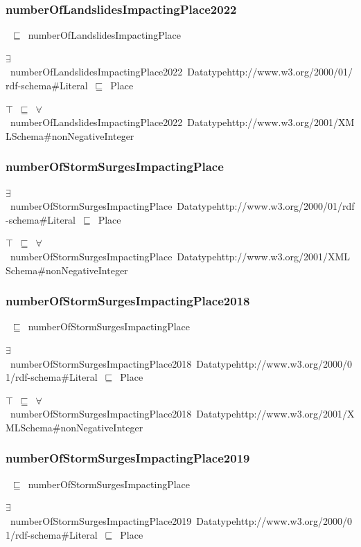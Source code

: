 \documentclass{article}
\begin{document}
\subsubsection*{numberOfLandslidesImpactingPlace2022}

~\ensuremath{\sqsubseteq}~numberOfLandslidesImpactingPlace

\ensuremath{\exists}~numberOfLandslidesImpactingPlace2022~Datatypehttp://www.w3.org/2000/01/rdf-schema#Literal~\ensuremath{\sqsubseteq}~Place

\ensuremath{\top}~\ensuremath{\sqsubseteq}~\ensuremath{\forall}~numberOfLandslidesImpactingPlace2022~Datatypehttp://www.w3.org/2001/XMLSchema#nonNegativeInteger

\subsubsection*{numberOfStormSurgesImpactingPlace}

\ensuremath{\exists}~numberOfStormSurgesImpactingPlace~Datatypehttp://www.w3.org/2000/01/rdf-schema#Literal~\ensuremath{\sqsubseteq}~Place

\ensuremath{\top}~\ensuremath{\sqsubseteq}~\ensuremath{\forall}~numberOfStormSurgesImpactingPlace~Datatypehttp://www.w3.org/2001/XMLSchema#nonNegativeInteger

\subsubsection*{numberOfStormSurgesImpactingPlace2018}

~\ensuremath{\sqsubseteq}~numberOfStormSurgesImpactingPlace

\ensuremath{\exists}~numberOfStormSurgesImpactingPlace2018~Datatypehttp://www.w3.org/2000/01/rdf-schema#Literal~\ensuremath{\sqsubseteq}~Place

\ensuremath{\top}~\ensuremath{\sqsubseteq}~\ensuremath{\forall}~numberOfStormSurgesImpactingPlace2018~Datatypehttp://www.w3.org/2001/XMLSchema#nonNegativeInteger

\subsubsection*{numberOfStormSurgesImpactingPlace2019}

~\ensuremath{\sqsubseteq}~numberOfStormSurgesImpactingPlace

\ensuremath{\exists}~numberOfStormSurgesImpactingPlace2019~Datatypehttp://www.w3.org/2000/01/rdf-schema#Literal~\ensuremath{\sqsubseteq}~Place
\end{document}
